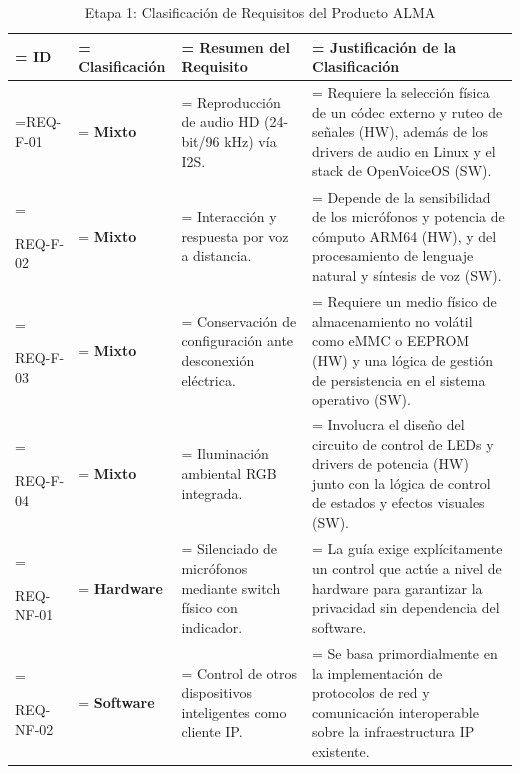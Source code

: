 \documentclass[%
	paper=a4,
	twoside=false,
	parskip=half,
	chapterprefix=false,
	10pt,
	headings=normal,
	bibliography=totoc,
	listof=totoc,
	titlepage=on,
	captions=tableabove,
	draft=false, 
]{scrbook}%
\begin{document}
\begin{table}[H]
    \caption{Etapa 1: Clasificación de Requisitos del Producto ALMA}
    \centering
    \renewcommand{\arraystretch}{1.5}
    \begin{tabularx}{\textwidth}{|>{\hsize=0.12\hsize\linewidth=\hsize}X|
                                   >{\hsize=0.18\hsize\linewidth=\hsize}X|
                                   >{\hsize=0.35\hsize\linewidth=\hsize}X|
                                   >{\hsize=0.35\hsize\linewidth=\hsize}X|}
        \hline
        \rowcolor[HTML]{EFEFEF}
        \textbf{ID} & \textbf{Clasificación} & \textbf{Resumen del Requisito} & \textbf{Justificación de la Clasificación} \\ \hline

        REQ-F-01 & \textbf{Mixto} & Reproducción de audio HD (24-bit/96 kHz) vía I2S. & Requiere la selección física de un códec externo y ruteo de señales (HW), además de los drivers de audio en Linux y el stack de OpenVoiceOS (SW). \\ \hline

        REQ-F-02 & \textbf{Mixto} & Interacción y respuesta por voz a distancia. & Depende de la sensibilidad de los micrófonos y potencia de cómputo ARM64 (HW), y del procesamiento de lenguaje natural y síntesis de voz (SW). \\ \hline

        REQ-F-03 & \textbf{Mixto} & Conservación de configuración ante desconexión eléctrica. & Requiere un medio físico de almacenamiento no volátil como eMMC o EEPROM (HW) y una lógica de gestión de persistencia en el sistema operativo (SW). \\ \hline

        REQ-F-04 & \textbf{Mixto} & Iluminación ambiental RGB integrada. & Involucra el diseño del circuito de control de LEDs y drivers de potencia (HW) junto con la lógica de control de estados y efectos visuales (SW). \\ \hline

        REQ-NF-01 & \textbf{Hardware} & Silenciado de micrófonos mediante switch físico con indicador. & La guía exige explícitamente un control que actúe a nivel de hardware para garantizar la privacidad sin dependencia del software. \\ \hline

        REQ-NF-02 & \textbf{Software} & Control de otros dispositivos inteligentes como cliente IP. & Se basa primordialmente en la implementación de protocolos de red y comunicación interoperable sobre la infraestructura IP existente. \\ \hline


\end{tabularx}
\end{table}
\end{document}
